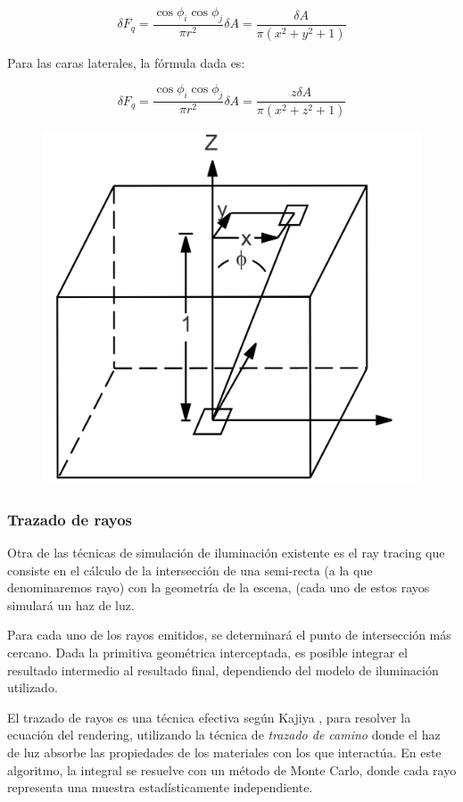 \begin{equation}
	\delta{F_{q}} = \frac{\cos{\phi_{i}}\cos{\phi_{j}}}{\pi{r^{2}}} \delta{A} = \frac{\delta{A}}{\pi({x^{2} + y^{2} + 1})} 
\end{equation}

Para las caras laterales, la fórmula dada es:

\begin{equation}
\delta{F_{q}} = \frac{\cos{\phi_{i}}\cos{\phi_{j}}}{\pi{r^{2}}}\delta{A} = \frac{z\delta{A}}{\pi({x^{2} + z^{2} + 1})}
\end{equation}

\begin{figure}[H]
	\centering
	\includegraphics[width=0.4\linewidth]{assets/deltaff}
	\label{img:deltaff}
\end{figure}


\subsubsection{Trazado de rayos}
\label{sec:raytracing}

Otra de las técnicas de simulación de iluminación existente es el ray tracing que consiste en el cálculo de la intersección de una semi-recta (a la que denominaremos rayo) con la geometría de la escena, (cada uno de estos rayos simulará un haz de luz.

Para cada uno de los rayos emitidos, se determinará el punto de intersección más cercano. Dada la primitiva geométrica interceptada, es posible integrar el resultado intermedio al resultado final, dependiendo del modelo de iluminación utilizado.

El trazado de rayos es una técnica efectiva según Kajiya \cite{Kajiya}, para resolver la ecuación del rendering, utilizando la técnica de \textit{trazado de camino} donde el haz de luz absorbe las propiedades de los materiales con los que interactúa. En este algoritmo, la integral se resuelve con un método de Monte Carlo, donde cada rayo representa una muestra estadísticamente independiente.

